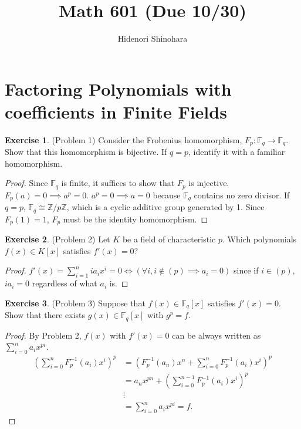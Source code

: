 \documentclass[12pt, psamsfonts]{amsart}
\theoremstyle{definition}
\newtheorem*{exer}{Exercise}
\theoremstyle{remark}
\numberwithin{equation}{section}
\begin{document}
\title{Math 601 (Due 10/30)}
\author{Hidenori Shinohara}
\maketitle

\tableofcontents

\section{Factoring Polynomials with coefficients in Finite Fields}

\begin{exer}{(Problem 1)}
  Consider the Frobenius homomorphism, $F_p: \mathbb{F}_q \rightarrow \mathbb{F}_q$.
  Show that this homomorphism is bijective.
  If $q = p$, identify it with a familiar homomorphism.
\end{exer}

\begin{proof}
  Since $\mathbb{F}_q$ is finite, it suffices to show that $F_p$ is injective.
  $F_p(a) = 0 \implies a^p = 0$.
  $a^p = 0 \implies a = 0$ because $\mathbb{F}_q$ contains no zero divisor.
  If $q = p$, $\mathbb{F}_q \cong \mathbb{Z}/p\mathbb{Z}$, which is a cyclic additive group generated by 1.
  Since $F_p(1) = 1$, $F_p$ must be the identity homomorphism.
\end{proof}

\begin{exer}{(Problem 2)}
  Let $K$ be a field of characteristic $p$.
  Which polynomials $f(x) \in K[x]$ satisfies $f'(x) = 0$?
\end{exer}

\begin{proof}
  $f'(x) = \sum_{i=1}^{n} ia_ix^i = 0 \iff (\forall i, i \notin (p) \implies a_i = 0)$ since if $i \in (p)$, $ia_i = 0$ regardless of what $a_i$ is.
\end{proof}

\begin{exer}{(Problem 3)}
  Suppose that $f(x) \in \mathbb{F}_q[x]$ satisfies $f'(x) = 0$.
  Show that there exists $g(x) \in \mathbb{F}_q[x]$ with $g^p = f$.
\end{exer}

\begin{proof}
  By Problem 2, $f(x)$ with $f'(x) = 0$ can be always written as $\sum_{i=0}^{n} a_ix^{pi}$.
  \begin{align*}
    (\sum_{i=0}^{n} F_p^{-1}(a_{i})x^{i})^p
      &= (F_p^{-1}(a_{n})x^{n} + \sum_{i=0}^{n} F_p^{-1}(a_{i})x^{i})^p \\
      &= a_{n}x^{pn} + (\sum_{i=0}^{n - 1} F_p^{-1}(a_{i})x^{i})^p \\
      &\vdots \\
      &= \sum_{i=0}^{n} a_ix^{pi} = f.
  \end{align*}
\end{proof}
\end{document}
